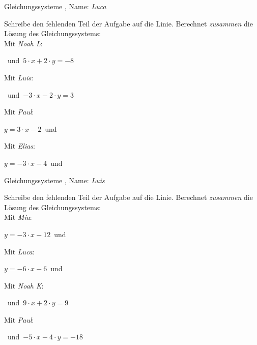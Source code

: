 \newpage
\begin{center}\large Gleichungssysteme
, Name: \emph{Luca}\end{center}
Schreibe den fehlenden Teil der Aufgabe auf die Linie. Berechnet \emph{zusammen} die Lösung des Gleichungssystems:
\\
\vfill Mit \emph{Noah L}:
\begin{center}\underline{}
\mbox{ }und\mbox{ }$5\cdot x+2\cdot y=-8$\end{center}
\vfill Mit \emph{Luis}:
\begin{center}\underline{}
\mbox{ }und\mbox{ }$-3\cdot x-2\cdot y=3$\end{center}
\vfill Mit \emph{Paul}:
\begin{center}$y=3\cdot x-2$\mbox{ }und\mbox{ }\underline{}
\end{center}
\vfill Mit \emph{Elias}:
\begin{center}$y=-3\cdot x-4$\mbox{ }und\mbox{ }\underline{}
\end{center}
\newpage
\begin{center}\large Gleichungssysteme
, Name: \emph{Luis}\end{center}
Schreibe den fehlenden Teil der Aufgabe auf die Linie. Berechnet \emph{zusammen} die Lösung des Gleichungssystems:
\\
\vfill Mit \emph{Mia}:
\begin{center}$y=-3\cdot x-12$\mbox{ }und\mbox{ }\underline{}
\end{center}
\vfill Mit \emph{Luca}:
\begin{center}$y=-6\cdot x-6$\mbox{ }und\mbox{ }\underline{}
\end{center}
\vfill Mit \emph{Noah K}:
\begin{center}\underline{}
\mbox{ }und\mbox{ }$9\cdot x+2\cdot y=9$\end{center}
\vfill Mit \emph{Paul}:
\begin{center}\underline{}
\mbox{ }und\mbox{ }$-5\cdot x-4\cdot y=-18$\end{center}
